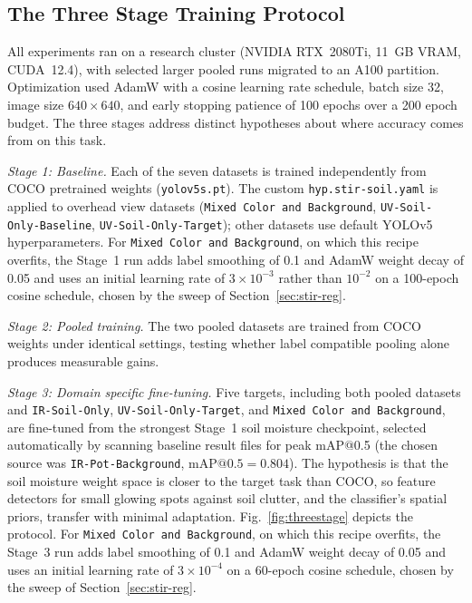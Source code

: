 ﻿\documentclass[journal]{IEEEtran}
\begin{document}
\subsection{The Three Stage Training Protocol}
All experiments ran on a research cluster (NVIDIA RTX~2080Ti, 11~GB VRAM, CUDA~12.4), with selected larger pooled runs migrated to an A100 partition. Optimization used AdamW with a cosine learning rate schedule, batch size 32, image size $640 \times 640$, and early stopping patience of 100 epochs over a 200 epoch budget. The three stages address distinct hypotheses about where accuracy comes from on this task.

\emph{Stage 1: Baseline.} Each of the seven datasets is trained independently from COCO pretrained weights (\texttt{yolov5s.pt}). The custom \texttt{hyp.stir-soil.yaml} is applied to overhead view datasets (\texttt{Mixed Color and Background}, \texttt{UV-Soil-Only-Baseline}, \texttt{UV-Soil-Only-Target}); other datasets use default YOLOv5 hyperparameters. For \texttt{Mixed Color and Background}, on which this recipe overfits, the Stage~1 run adds label smoothing of 0.1 and AdamW weight decay of 0.05 and uses an initial learning rate of $3 \times 10^{-3}$ rather than $10^{-2}$ on a 100-epoch cosine schedule, chosen by the sweep of Section~\ref{sec:stir-reg}.

\emph{Stage 2: Pooled training.} The two pooled datasets are trained from COCO weights under identical settings, testing whether label compatible pooling alone produces measurable gains.

\emph{Stage 3: Domain specific fine-tuning.} Five targets, including both pooled datasets and \texttt{IR-Soil-Only}, \texttt{UV-Soil-Only-Target}, and \texttt{Mixed Color and Background}, are fine-tuned from the strongest Stage~1 soil moisture checkpoint, selected automatically by scanning baseline result files for peak mAP@0.5 (the chosen source was \texttt{IR-Pot-Background}, $\text{mAP@0.5}=0.804$). The hypothesis is that the soil moisture weight space is closer to the target task than COCO, so feature detectors for small glowing spots against soil clutter, and the classifier's spatial priors, transfer with minimal adaptation. Fig.~\ref{fig:threestage} depicts the protocol. For \texttt{Mixed Color and Background}, on which this recipe overfits, the Stage~3 run adds label smoothing of 0.1 and AdamW weight decay of 0.05 and uses an initial learning rate of $3 \times 10^{-4}$ on a 60-epoch cosine schedule, chosen by the sweep of Section~\ref{sec:stir-reg}.
\end{document}
